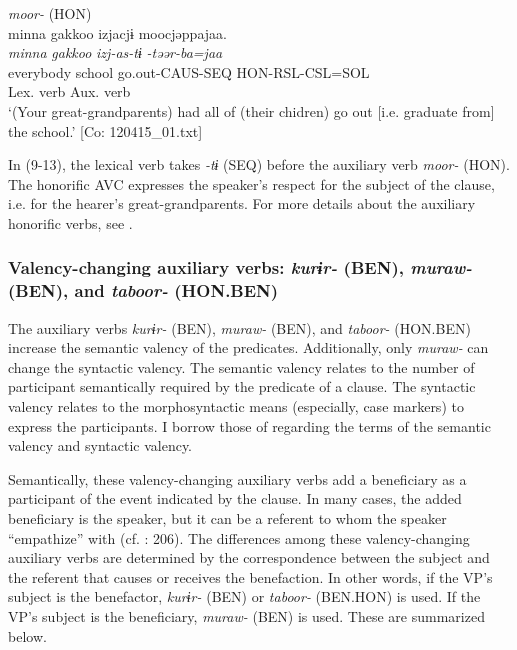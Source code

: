 \ea   \textit{moor-} (HON) \label{ex:9.13}\\
 \gllll  minna  {\textbar}gakkoo{\textbar}  izjacjɨ  moocjəppajaa.\\
    \textit{minna}  \textit{gakkoo}  \textit{izj-as-tɨ}  \textit{-təər-ba=jaa}\\
    everybody  school  go.out-CAUS-SEQ  HON-RSL-CSL=SOL\\
        Lex. verb  Aux. verb\\
    \glt     ‘(Your great-grandparents) had all of (their chidren) go out [i.e. graduate from] the school.’ [Co: 120415\_01.txt]
\z

In (9-13), the lexical verb takes \textit{{}-tɨ} (SEQ) before the auxiliary verb \textit{moor-} (HON). The honorific AVC expresses the speaker’s respect for the subject of the clause, i.e. for the hearer’s great-grandparents. For more details about the auxiliary honorific verbs, see .

\subsubsection{Valency-changing auxiliary verbs: \textit{kurɨr-} (BEN), \textit{muraw-} (BEN), and \textit{taboor-} (HON.BEN)}\label{sec:9.1.1.3}

The auxiliary verbs \textit{kurɨr-} (BEN), \textit{muraw-} (BEN), and \textit{taboor-} (HON.BEN) increase the semantic valency of the predicates. Additionally, only \textit{muraw-} can change the syntactic valency. The semantic valency relates to the number of participant semantically required by the predicate of a clause. The syntactic valency relates to the morphosyntactic means (especially, case markers) to express the participants. I borrow those of \citet[169-173]{Payne1997} regarding the terms of the semantic valency and syntactic valency.

Semantically, these valency-changing auxiliary verbs add a beneficiary as a participant of the event indicated by the clause. In many cases, the added beneficiary is the speaker, but it can be a referent to whom the speaker “empathize” with (cf. \citealt{Kuno1987}: 206). The differences among these valency-changing auxiliary verbs are determined by the correspondence between the subject and the referent that causes or receives the benefaction. In other words, if the VP’s subject is the benefactor, \textit{kurɨr-} (BEN) or \textit{taboor-} (BEN.HON) is used. If the VP’s subject is the beneficiary, \textit{muraw-} (BEN) is used. These are summarized below.

